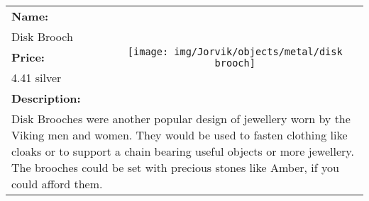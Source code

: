 \begin{table}[ht!]
	\centering
	\begin{tabular}{ p{3cm} c }\toprule
		\textbf{Name:} & \multirow{5}{*}{\texttt{[image: img/Jorvik/objects/metal/disk brooch]}}\\
		Disk Brooch & \\ 
		\textbf{Price:} & \\
		4.41 silver & \\ 
		\textbf{Description:} & \\
		\multicolumn{2}{p{12cm}}{Disk Brooches were another popular design of jewellery worn by the Viking men and women. They would be used to fasten clothing like cloaks or to support a chain bearing useful objects or more jewellery. The brooches could be set with precious stones like Amber, if you could afford them.}\\
		\bottomrule
	\end{tabular}
\end{table}